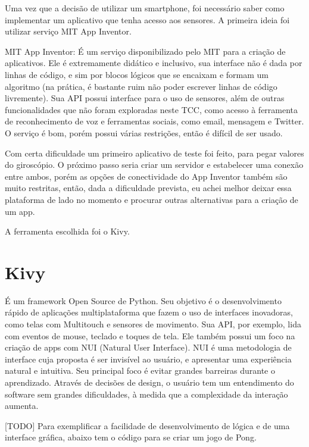 \documentclass[a4paper,12pt]{article}
\begin{document}
  Uma vez que a decisão de utilizar um smartphone, foi necessário saber como implementar um aplicativo que tenha acesso aos sensores.
  A primeira ideia foi utilizar serviço MIT App Inventor.


MIT App Inventor:
  É um serviço disponibilizado pelo MIT para a criação de aplicativos. Ele é extremamente didático e inclusivo, sua interface não é dada por linhas de código, e sim por blocos lógicos que se encaixam e formam um algoritmo (na prática, é bastante ruim não poder escrever linhas de código livremente). Sua API possui interface para o uso de sensores, além de outras funcionalidades que não foram exploradas neste TCC, como acesso à ferramenta de reconhecimento de voz e ferramentas sociais, como email, mensagem e Twitter. O serviço é bom, porém possui várias restrições, então é difícil de ser usado.


Com certa dificuldade um primeiro aplicativo de teste foi feito, para pegar valores do giroscópio. O próximo passo seria criar um servidor e estabelecer uma conexão entre ambos, porém as opções de conectividade do App Inventor também são muito restritas, então, dada a dificuldade prevista, eu achei melhor deixar essa plataforma de lado no momento e procurar outras alternativas para a criação de um app.


A ferramenta escolhida foi o Kivy.

\section{Kivy}

É um framework Open Source de Python. Seu objetivo é o desenvolvimento rápido de aplicações multiplataforma que fazem o uso de interfaces inovadoras, como telas com Multitouch e sensores de movimento. Sua API, por exemplo, lida com eventos de mouse, teclado e toques de tela. Ele também possui um foco na criação de apps com NUI (Natural User Interface).
  NUI é uma metodologia de interface cuja proposta é ser invisível ao usuário, e apresentar uma experiência natural e intuitiva. Seu principal foco é evitar grandes barreiras durante o aprendizado. Através de decisões de design, o usuário tem um entendimento do software sem grandes dificuldades, à medida que a complexidade da interação aumenta.

[TODO] Para exemplificar a facilidade de desenvolvimento de lógica e de uma interface gráfica, abaixo tem o código para se criar um jogo de Pong.
\end{document}
